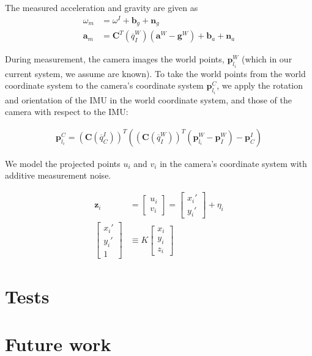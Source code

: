 \documentclass[letterpaper]{article}
\newcommand{\bb}[1]{\mathbf{#1}}
\begin{document}
The measured acceleration and gravity are given as
\begin{align}
\omega_m&=\omega^I+\bb{b}_g+\bb{n}_g \nonumber \\
\bb{a}_m&=\bb{C}^T(\overline{q}_I^W)(\bb{a}^W-\bb{g}^W)+\bb{b}_a+\bb{n}_a
\end{align}

During measurement, the camera images the world points, $\bb{p}_{l_i}^W$ (which in our current system, we assume are known). To take the world points from the world coordinate system to the camera's coordinate system $\bb{p}_{l_i}^C$, we apply the rotation and orientation of the IMU in the world coordinate system, and those of the camera with respect to the IMU:

\begin{align}
\bb{p}_{l_i}^C=(\bb{C}(\overline{q}_C^I))^T \left((\bb{C}(\overline{q}_I^W))^T \left(\bb{p}_{l_i}^W-\bb{p}_I^W\right) -\bb{p}_C^I \right)
\end{align}

We model the projected points $u_i$ and $v_i$ in the camera's coordinate system with additive measurement noise. 

\begin{align}
\bb{z}_i&=\begin{bmatrix} u_i \\ v_i \end{bmatrix}=\begin{bmatrix} x_i' \\ y_i' \end{bmatrix}+\eta_i \nonumber\\
\begin{bmatrix} x_i' \\ y_i' \\ 1 \end{bmatrix} & \equiv K\begin{bmatrix} x_i \\ y_i  \\ z_i \end{bmatrix}
\end{align}



\section{Tests}

\section{Future work}

\end{document}
